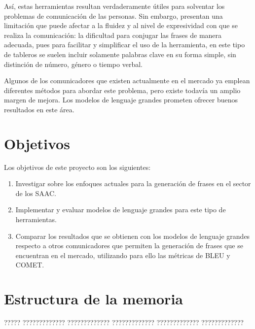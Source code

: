 \documentclass[11pt,spanish,listoffigures,listoftables]{tfgetsinf}
\begin{document}
Así, estas herramientas resultan verdaderamente útiles para solventar los problemas de comunicación de las personas. Sin embargo, presentan una limitación que puede afectar a la fluidez y al nivel de expresividad con que se realiza la comunicación: la dificultad para conjugar las frases de manera adecuada, pues para facilitar y simplificar el uso de la herramienta, en este tipo de tableros se suelen incluir solamente palabras clave en su forma simple, sin distinción de número, género o tiempo verbal.

Algunos de los comunicadores que existen actualmente en el mercado ya emplean diferentes métodos para abordar este problema, pero existe todavía un amplio margen de mejora. Los modelos de lenguaje grandes prometen ofrecer buenos resultados en este área.


\section{Objetivos}

Los objetivos de este proyecto son los siguientes:
\begin{enumerate}
\item Investigar sobre los enfoques actuales para la generación de frases en el sector de los SAAC.
\item Implementar y evaluar modelos de lenguaje grandes para este tipo de herramientas.
\item Comparar los resultados que se obtienen con los modelos de lenguaje grandes respecto a otros comunicadores que permiten la generación de frases que se encuentran en el mercado, utilizando para ello las métricas de BLEU y COMET.
\end{enumerate}

\section{Estructura de la memoria}

????? ????????????? ????????????? ????????????? ????????????? ????????????? 



\end{document}
